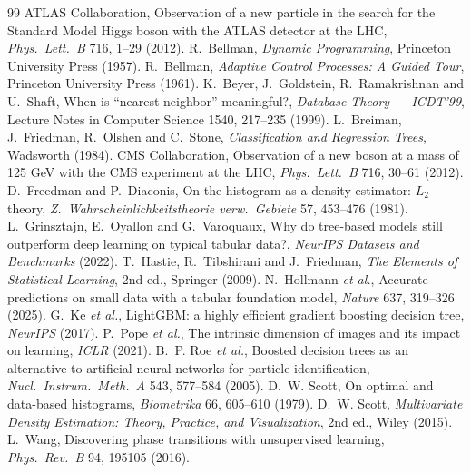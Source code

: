 \documentclass[11pt]{article}
\begin{document}
\begin{thebibliography}{99}\small
{} ATLAS Collaboration, Observation of a new particle in the search for the Standard Model Higgs boson with the ATLAS detector at the LHC, \emph{Phys.\ Lett.\ B} 716, 1--29 (2012).
 R.~Bellman, \emph{Dynamic Programming}, Princeton University Press (1957).
 R.~Bellman, \emph{Adaptive Control Processes: A Guided Tour}, Princeton University Press (1961).
 K.~Beyer, J.~Goldstein, R.~Ramakrishnan and U.~Shaft, When is ``nearest neighbor'' meaningful?, \emph{Database Theory --- ICDT'99}, Lecture Notes in Computer Science 1540, 217--235 (1999).
 L.~Breiman, J.~Friedman, R.~Olshen and C.~Stone, \emph{Classification and Regression Trees}, Wadsworth (1984).
 CMS Collaboration, Observation of a new boson at a mass of 125 GeV with the CMS experiment at the LHC, \emph{Phys.\ Lett.\ B} 716, 30--61 (2012).
 D.~Freedman and P.~Diaconis, On the histogram as a density estimator: $L_2$ theory, \emph{Z.\ Wahrscheinlichkeitstheorie verw.\ Gebiete} 57, 453--476 (1981).
 L.~Grinsztajn, E.~Oyallon and G.~Varoquaux, Why do tree-based models still outperform deep learning on typical tabular data?, \emph{NeurIPS Datasets and Benchmarks} (2022).
 T.~Hastie, R.~Tibshirani and J.~Friedman, \emph{The Elements of Statistical Learning}, 2nd ed., Springer (2009).
 N.~Hollmann \emph{et al.}, Accurate predictions on small data with a tabular foundation model, \emph{Nature} 637, 319--326 (2025).
 G.~Ke \emph{et al.}, LightGBM: a highly efficient gradient boosting decision tree, \emph{NeurIPS} (2017).
 P.~Pope \emph{et al.}, The intrinsic dimension of images and its impact on learning, \emph{ICLR} (2021).
 B.~P. Roe \emph{et al.}, Boosted decision trees as an alternative to artificial neural networks for particle identification, \emph{Nucl.\ Instrum.\ Meth.\ A} 543, 577--584 (2005).
 D.~W. Scott, On optimal and data-based histograms, \emph{Biometrika} 66, 605--610 (1979).
 D.~W. Scott, \emph{Multivariate Density Estimation: Theory, Practice, and Visualization}, 2nd ed., Wiley (2015).
 L.~Wang, Discovering phase transitions with unsupervised learning, \emph{Phys.\ Rev.\ B} 94, 195105 (2016).
\end{thebibliography}

\SourceNote
\end{document}
